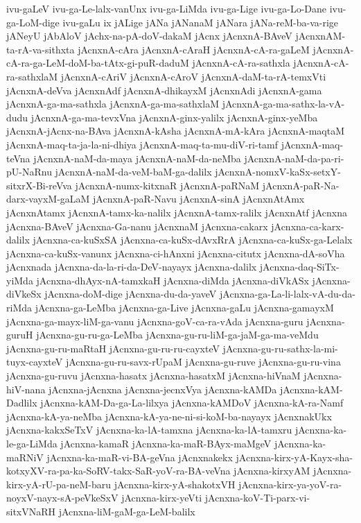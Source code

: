 {ivu-gaLeV
ivu-ga-Le-lalx-vanUnx
ivu-ga-LiMda
ivu-ga-Lige
ivu-ga-Lo-Dane
ivu-ga-LoM-dige
ivu-gaLu
ix
jALige
jANa
jANanaM
jANara
jANa-reM-ba-va-rige
jANeyU
jAbAloV
jAchx-na-pA-doV-dakaM
jAcnx
jAcnxnA-BAveV
jAcnxnAM-ta-rA-va-sithxta
jAcnxnA-cAra
jAcnxnA-cAraH
jAcnxnA-cA-ra-gaLeM
jAcnxnA-cA-ra-ga-LeM-doM-ba-tAtx-gi-puR-daduM
jAcnxnA-cA-ra-sathxla
jAcnxnA-cA-ra-sathxlaM
jAcnxnA-cAriV
jAcnxnA-cAroV
jAcnxnA-daM-ta-rA-temxVti
jAcnxnA-deVva
jAcnxnAdf
jAcnxnA-dhikayxM
jAcnxnAdi
jAcnxnA-gama
jAcnxnA-ga-ma-sathxla
jAcnxnA-ga-ma-sathxlaM
jAcnxnA-ga-ma-sathx-la-vA-dudu
jAcnxnA-ga-ma-tevxVna
jAcnxnA-ginx-yalilx
jAcnxnA-ginx-yeMba
jAcnxnA-jAcnx-na-BAva
jAcnxnA-kAsha
jAcnxnA-mA-kAra
jAcnxnA-maqtaM
jAcnxnA-maq-ta-ja-la-ni-dhiya
jAcnxnA-maq-ta-mu-diV-ri-tamf
jAcnxnA-maq-teVna
jAcnxnA-naM-da-maya
jAcnxnA-naM-da-neMba
jAcnxnA-naM-da-pa-ri-pU-NaRnu
jAcnxnA-naM-da-veM-baM-ga-dalilx
jAcnxnA-nomxV-kaSx-setxY-sitxrX-Bi-reVva
jAcnxnA-numx-kitxnaR
jAcnxnA-paRNaM
jAcnxnA-paR-Na-darx-vayxM-gaLaM
jAcnxnA-paR-Navu
jAcnxnA-sinA
jAcnxnAtAmx
jAcnxnAtamx
jAcnxnA-tamx-ka-nalilx
jAcnxnA-tamx-ralilx
jAcnxnAtf
jAcnxna
jAcnxna-BAveV
jAcnxna-Ga-nanu
jAcnxnaM
jAcnxna-cakarx
jAcnxna-ca-karx-dalilx
jAcnxna-ca-kuSxSA
jAcnxna-ca-kuSx-dAvxRrA
jAcnxna-ca-kuSx-ga-Lelalx
jAcnxna-ca-kuSx-vanunx
jAcnxna-ci-hAnxni
jAcnxna-citutx
jAcnxna-dA-soVha
jAcnxnada
jAcnxna-da-la-ri-da-DeV-nayayx
jAcnxna-dalilx
jAcnxna-daq-SiTx-yiMda
jAcnxna-dhAyx-nA-tamxkaH
jAcnxna-diMda
jAcnxna-diVkASx
jAcnxna-diVkeSx
jAcnxna-doM-dige
jAcnxna-du-da-yaveV
jAcnxna-ga-La-li-lalx-vA-du-da-riMda
jAcnxna-ga-LeMba
jAcnxna-ga-Live
jAcnxna-gaLu
jAcnxna-gamayxM
jAcnxna-ga-mayx-liM-ga-vanu
jAcnxna-goV-ca-ra-vAda
jAcnxna-guru
jAcnxna-guruH
jAcnxna-gu-ru-ga-LeMba
jAcnxna-gu-ru-liM-ga-jaM-ga-ma-veMdu
jAcnxna-gu-ru-maRtaH
jAcnxna-gu-ru-ru-cayxteV
jAcnxna-gu-ru-sathx-la-mi-tuyx-cayxteV
jAcnxna-gu-ru-savx-rUpaM
jAcnxna-gu-ruve
jAcnxna-gu-ru-vina
jAcnxna-gu-ruvu
jAcnxna-hasatx
jAcnxna-hasatxM
jAcnxna-hiVnaM
jAcnxna-hiV-nana
jAcnxna-jAcnxna
jAcnxna-jecnxVya
jAcnxna-kAMDa
jAcnxna-kAM-Dadlilx
jAcnxna-kAM-Da-ga-La-lilxya
jAcnxna-kAMDoV
jAcnxna-kA-ra-Namf
jAcnxna-kA-ya-neMba
jAcnxna-kA-ya-ne-ni-si-koM-ba-nayayx
jAcnxnakUkx
jAcnxna-kakxSeTxV
jAcnxna-ka-lA-tamxna
jAcnxna-ka-lA-tamxru
jAcnxna-ka-le-ga-LiMda
jAcnxna-kamaR
jAcnxna-ka-maR-BAyx-maMgeV
jAcnxna-ka-maRNiV
jAcnxna-ka-maR-vi-BA-geVna
jAcnxnakekx
jAcnxna-kirx-yA-Kayx-sha-kotxyXV-ra-pa-ka-SoRV-takx-SaR-yoV-ra-BA-veVna
jAcnxna-kirxyAM
jAcnxna-kirx-yA-rU-pa-neM-baru
jAcnxna-kirx-yA-shakotxVH
jAcnxna-kirx-ya-yoV-ra-noyxV-nayx-sA-peVkeSxV
jAcnxna-kirx-yeVti
jAcnxna-koV-Ti-parx-vi-sitxVNaRH
jAcnxna-liM-gaM-ga-LeM-balilx
}
